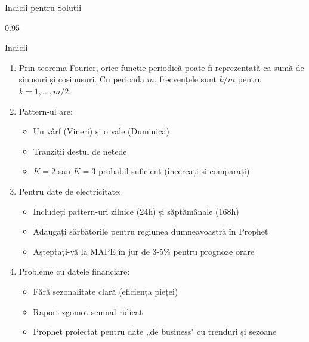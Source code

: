 \documentclass[9pt, aspectratio=169, t]{beamer}
\begin{document}
\begin{frame}{Indicii pentru Soluții}
    \begin{cminipage}{0.95\textwidth}
    {\footnotesize
    \begin{block}{Indicii}
        \begin{enumerate}\setlength{\itemsep}{1pt}\parsep=0pt
            \item Prin teorema Fourier, orice funcție periodică poate fi reprezentată ca sumă de sinusuri și cosinusuri. Cu perioada $m$, frecvențele sunt $k/m$ pentru $k = 1, \ldots, m/2$.
            \item Pattern-ul are:
                \begin{itemize}\setlength{\itemsep}{0pt}\parsep=0pt\topsep=0pt
                    \item Un vârf (Vineri) și o vale (Duminică)
                    \item Tranziții destul de netede
                    \item $K=2$ sau $K=3$ probabil suficient (încercați și comparați)
                \end{itemize}
            \item Pentru date de electricitate:
                \begin{itemize}\setlength{\itemsep}{0pt}\parsep=0pt\topsep=0pt
                    \item Includeți pattern-uri zilnice (24h) și săptămânale (168h)
                    \item Adăugați sărbătorile pentru regiunea dumneavoastră în Prophet
                    \item Așteptați-vă la MAPE în jur de 3-5\% pentru prognoze orare
                \end{itemize}
            \item Probleme cu datele financiare:
                \begin{itemize}\setlength{\itemsep}{0pt}\parsep=0pt\topsep=0pt
                    \item Fără sezonalitate clară (eficiența pieței)
                    \item Raport zgomot-semnal ridicat
                    \item Prophet proiectat pentru date „de business" cu trenduri și sezoane
                \end{itemize}
        \end{enumerate}
    \end{block}
    }
    \end{cminipage}
\end{frame}
\end{document}
